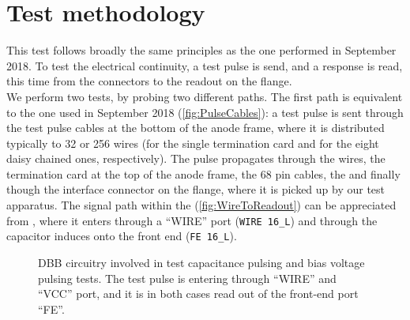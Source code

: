 \section{Test methodology}
\label{sec:methodology}

This test follows broadly the same principles as the one performed in September
2018.
To test the electrical continuity, a test pulse is send, and a response is read,
this time from the connectors to the readout on the flange.
\\
We perform two tests, by probing two different paths.
The first path is equivalent to the one used in September 2018
(\cref{fig:PulseCables}): a test pulse is
sent through the test pulse cables at the bottom of the anode frame, where it is
distributed typically to 32 or 256 wires (for the single termination card and
for the eight daisy chained ones, respectively).
The pulse propagates through the wires, the termination card at the top of the
anode frame, the 68 pin cables, the \DBB and finally though the interface
connector on the flange, where it is picked up by our test apparatus.
The signal path within the \DBB (\cref{fig:WireToReadout}) can be appreciated
from \cite{ICARUSDBB}, where it enters through a ``WIRE'' port
(\eg \texttt{WIRE 16\_L}) and through the
 capacitor induces onto the front end (\eg \texttt{FE 16\_L}).
\\
\begin{figure}
  \caption{
    DBB circuitry\cite{ICARUSDBB} involved in \protect{}
    test capacitance pulsing and \protect{} bias
    voltage pulsing tests. The test pulse is entering through
    \protect{} ``WIRE'' and
    \protect{} ``VCC'' port, and it is in both
    cases read out of the front-end port ``FE''.
    \label{fig:DBBcircuitryTest}
  }
\end{figure}

